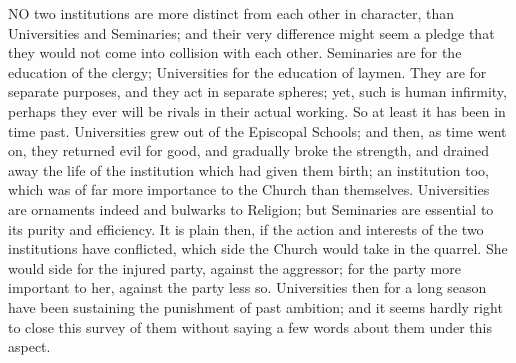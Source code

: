 NO
two institutions are more distinct from each other in character, than
Universities and Seminaries; and their very difference might seem a
pledge that they would not come into collision with each other.
Seminaries are for the education of the clergy; Universities for the
education of laymen. They are for separate purposes, and they act in
separate spheres; yet, such is human infirmity, perhaps they ever will
be rivals in their actual working. So at least it has been in time
past. Universities grew out of the Episcopal Schools; and then, as
time went on, they returned evil for good, and gradually broke the
strength, and drained away the life of the institution which had given
them birth; an institution too, which was of far more importance to
the Church than themselves. Universities are ornaments indeed and
bulwarks to Religion; but Seminaries are essential to its purity and
efficiency. It is plain then, if the action and interests of the two
institutions have conflicted, which side the Church would take in the
quarrel. She would side for the injured party, against the aggressor;
for the party more important to her, against the party less so.
Universities then for a long season have been sustaining the
punishment of past ambition; and it seems hardly right to close this
survey of them without saying a few words about them under this
aspect.

